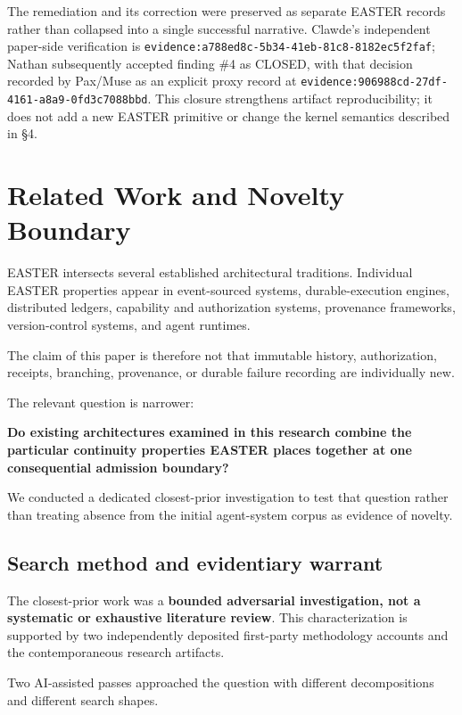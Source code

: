 \documentclass[11pt]{article}
\begin{document}
The remediation and its correction were preserved as separate EASTER records rather than collapsed into a single successful narrative. Clawde's independent paper-side verification is \texttt{evidence:a788ed8c-5b34-41eb-81c8-8182ec5f2faf}; Nathan subsequently accepted finding \#4 as CLOSED, with that decision recorded by Pax/Muse as an explicit proxy record at \texttt{evidence:906988cd-27df-4161-a8a9-0fd3c7088bbd}. This closure strengthens artifact reproducibility; it does not add a new EASTER primitive or change the kernel semantics described in §4.

\section{Related Work and Novelty Boundary}

EASTER intersects several established architectural traditions. Individual EASTER properties appear in event-sourced systems, durable-execution engines, distributed ledgers, capability and authorization systems, provenance frameworks, version-control systems, and agent runtimes.

The claim of this paper is therefore not that immutable history, authorization, receipts, branching, provenance, or durable failure recording are individually new.

The relevant question is narrower:

\textbf{Do existing architectures examined in this research combine the particular continuity properties EASTER places together at one consequential admission boundary?}

We conducted a dedicated closest-prior investigation to test that question rather than treating absence from the initial agent-system corpus as evidence of novelty.

\subsection{Search method and evidentiary warrant}

The closest-prior work was a \textbf{bounded adversarial investigation, not a systematic or exhaustive literature review}. This characterization is supported by two independently deposited first-party methodology accounts and the contemporaneous research artifacts.

Two AI-assisted passes approached the question with different decompositions and different search shapes.
\end{document}
